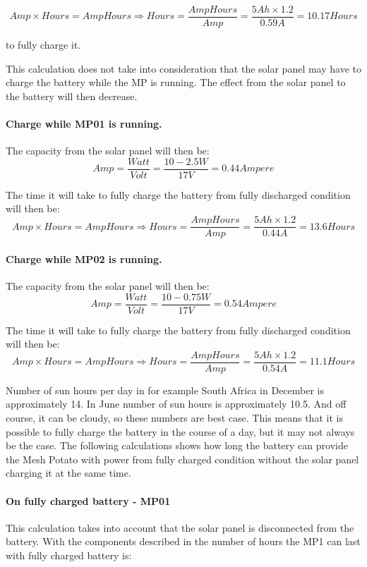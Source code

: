 $$Amp\times Hours = AmpHours \Rightarrow Hours =\frac{AmpHours}{Amp} = \frac{5 Ah\times 1.2}{0.59 A} = 10.17 Hours$$

to fully charge it. 

This calculation does not take into consideration that the solar panel may have to charge the battery while the MP is running. The effect from the solar panel to the battery will then decrease. 

\paragraph{Charge while MP01 is running.}
The capacity from the solar panel will then be: 
$$Amp = \frac{Watt}{Volt} = \frac{10-2.5 W}{17 V} = 0.44 Ampere$$

The time it will take to fully charge the battery from fully discharged condition will then be: 
$$Amp\times Hours = AmpHours \Rightarrow Hours =\frac{AmpHours}{Amp} = \frac{5 Ah\times 1.2}{0.44A} = 13.6 Hours$$

\paragraph{Charge while MP02 is running.}
The capacity from the solar panel will then be: 
$$Amp = \frac{Watt}{Volt} = \frac{10-0.75 W}{17 V} = 0.54 Ampere$$

The time it will take to fully charge the battery from fully discharged condition will then be: 
$$Amp\times Hours = AmpHours \Rightarrow Hours =\frac{AmpHours}{Amp} = \frac{5 Ah\times 1.2}{0.54A} = 11.1 Hours$$

Number of sun hours per day in for example South Africa in December is approximately 14. In June number of sun hours is approximately 10.5. And off course, it can be cloudy, so these numbers are best case. This means that it is possible to fully charge the battery in the course of a day, but it may not always be the case. The following calculations shows how long the battery can provide the Mesh Potato with power from fully charged condition without the solar panel charging it at the same time. 

\paragraph{On fully charged battery - MP01}
This calculation takes into account that the solar panel is disconnected from the battery. With the components described in  the number of hours the MP1 can last with fully charged battery is: 

